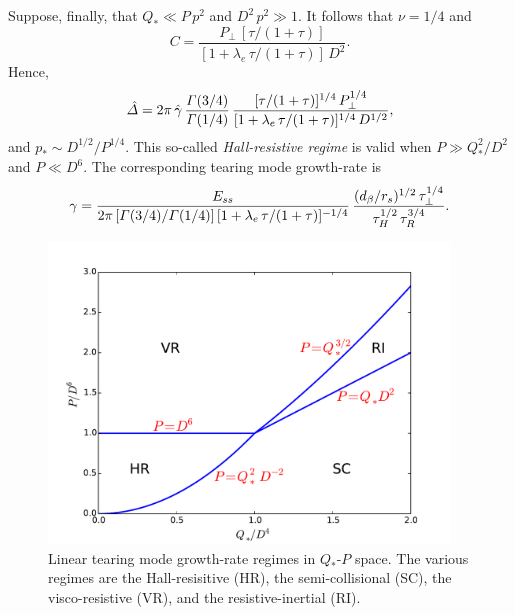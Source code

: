 \documentclass[notitlepage,12pt]{article}
\begin{document}
Suppose, finally, that $Q_\ast \ll P\,p^2$ and $D^2\,p^2\gg 1$. It follows that $\nu=1/4$ and
\begin{equation}
C = \frac{P_\perp\,[\tau/(1+\tau)]}{[1+\lambda_e\,\tau/(1+\tau)]\,D^2}.
\end{equation} 
Hence,
\begin{equation} 
\hat{\mit\Delta} = 2\pi\,\hat{\gamma}\,\frac{{\mit\Gamma}(3/4)}{{\mit\Gamma}(1/4)}\,\frac{[\tau/(1+\tau)]^{1/4}\,P_\perp^{1/4}}{[1+\lambda_e\,\tau/(1+\tau)]^{1/4}\,D^{1/2}},
\end{equation}
and $p_\ast \sim D^{1/2}/P^{1/4}$. This so-called {\em Hall-resistive regime}\/ is valid when $P\gg Q_\ast^2/D^2$ and
$P\ll D^6$. The corresponding tearing mode growth-rate is 
\begin{equation}\label{e371}
\gamma= \frac{E_{ss}}{2\pi\,[{\mit\Gamma}(3/4)/{\mit\Gamma}(1/4)]\,[1+\lambda_e\,\tau/(1+\tau)]^{-1/4}}\,\frac{(d_\beta/r_s)^{1/2}\,\tau_\perp^{1/4}}{\tau_H^{1/2}\,\tau_R^{3/4}}.
\end{equation}

\begin{figure}[t]
\centerline{\includegraphics[width=0.95\textwidth]{RegimeIII.pdf}}
\caption{Linear tearing mode growth-rate regimes  in $Q_\ast$-$P$ space. The various regimes are
the Hall-resisitive (HR), the semi-collisional (SC),  the visco-resistive (VR), and the resistive-inertial (RI).}\label{f3}
\end{figure}
\end{document}
